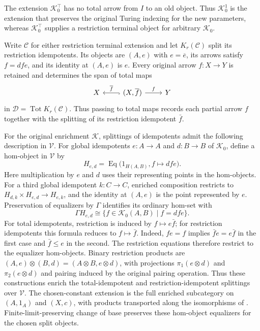 \documentclass[11pt]{article}
\theoremstyle{definition}
\theoremstyle{remark}
\begin{document}
The extension $\mathcal K_0^\top$ has no total arrow from $I$ to
an old object. Thus $\mathcal K_0^1$ is the extension that preserves
the original Turing indexing for the new parameters, whereas
$\mathcal K_0^\top$ supplies a restriction terminal object for arbitrary
$\mathcal K_0$.

Write $\mathcal C$ for either restriction terminal extension and let
$K_r(\mathcal C)$ split its restriction idempotents. Its objects
are $(A,e)$ with $e=\overline e$, its arrows satisfy $f=dfe$,
and its identity at $(A,e)$ is $e$. Every original arrow
$f:X\to Y$ is retained and determines the span of total maps
\[
\begin{tikzcd}
 X & (X,\overline f)
   \arrow[l, hook, "\overline f"'] \arrow[r, "f"] & Y
\end{tikzcd}
\]
in $\mathcal D=\operatorname{Tot}K_r(\mathcal C)$.
Thus passing to total maps records each partial arrow $f$ together
with the splitting of its restriction idempotent $\bar f$.

For the original enrichment $\mathcal K$, splittings of idempotents
admit the following description in $\mathscr V$.
For global idempotents $e:A\to A$ and $d:B\to B$ of
$\mathcal K_0$, define a hom-object in $\mathscr V$ by
\[
 H_{e,d}=\operatorname{Eq}\bigl(1_{H(A,B)},
             f\longmapsto dfe\bigr).
\]
Here multiplication by $e$ and $d$ uses their representing points
in the hom-objects. For a third global idempotent $k:C\to C$,
enriched composition restricts to
$H_{d,k}\times H_{e,d}\to H_{e,k}$, and the identity at $(A,e)$
is the point represented by $e$. Preservation of equalizers by
$\Gamma$ identifies its ordinary hom-set with
\[
 \Gamma H_{e,d}\cong
 \{f\in\mathcal K_0(A,B)\mid f=dfe\}.
\]
For total idempotents, restriction is induced by
$f\mapsto e\bar f$; for restriction idempotents this formula
reduces to $f\mapsto\bar f$. Indeed, $fe=f$ implies
$\bar f e=e\bar f$ in the first case and $\bar f\leq e$ in
the second. The restriction equations therefore restrict to the
equalizer hom-objects. Binary restriction products are
$(A,e)\otimes(B,d)=(A\otimes B,e\otimes d)$, with projections
$\pi_1(e\otimes d)$ and $\pi_2(e\otimes d)$ and pairing
induced by the original pairing operation. Thus these constructions
enrich the total-idempotent and restriction-idempotent splittings
over $\mathscr V$. The chosen-constant extension is the full
enriched subcategory on $(A,1_A)$ and $(X,c)$, with products
transported along the isomorphisms of
\cite[Section~3]{RecursionCompletions}.
Finite-limit-preserving change of base preserves these hom-object
equalizers for the chosen split objects.
\end{document}
